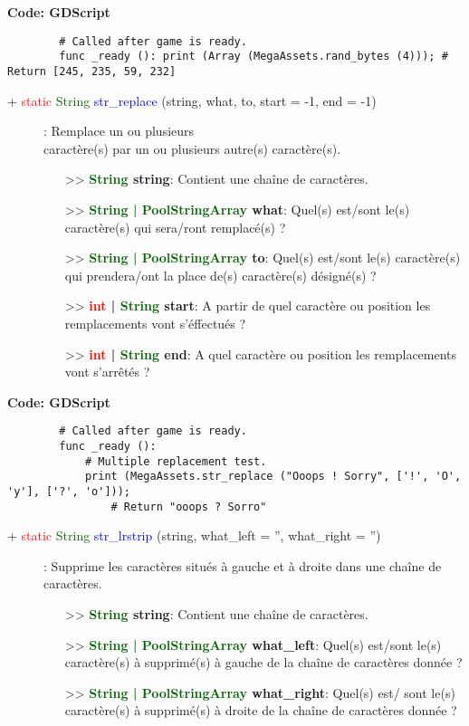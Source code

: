 \documentclass[a4paper, 11pt]{article}
\begin{document}
	\textbf{Code: GDScript}
	\begin{lstlisting}
		# Called after game is ready.
		func _ready (): print (Array (MegaAssets.rand_bytes (4))); # Return [245, 235, 59, 232]
	\end{lstlisting}
	\begin{description}
		\item [+ \textcolor{red}{static} \textcolor{darkgreen}{String} \textcolor{blue}{str\_replace} 
		(string, what, to, start = -1, end = -1)]: Remplace un ou plusieurs \\caractère(s) par un ou
		plusieurs autre(s) caractère(s).
		\begin{itemize}
			\item [>> \textbf{\textcolor{darkgreen}{String} string}:] Contient une chaîne de caractères.
			\item [>> \textbf{\textcolor{darkgreen}{String | PoolStringArray} what}:] Quel(s) est/sont le(s) 
			caractère(s) qui sera/ront remplacé(s) ?
			\item [>> \textbf{\textcolor{darkgreen}{String | PoolStringArray} to}:] Quel(s) est/sont le(s) 
			caractère(s) qui prendera/ont la place de(s) caractère(s) désigné(s) ?
			\item [>> \textbf{\textcolor{red}{int} | \textcolor{darkgreen}{String} start}:] A partir de quel
			caractère ou position les remplacements vont s'éffectués ?
			\item [>> \textbf{\textcolor{red}{int} | \textcolor{darkgreen}{String} end}:] A quel caractère 
			ou position les remplacements vont s'arrêtés ?\\
		\end{itemize}
	\end{description}
	\newpage \textbf{Code: GDScript}
	\begin{lstlisting}
		# Called after game is ready.
		func _ready ():
			# Multiple replacement test.
			print (MegaAssets.str_replace ("Ooops ! Sorry", ['!', 'O', 'y'], ['?', 'o']));
				# Return "ooops ? Sorro"
	\end{lstlisting}
	\begin{description}
		\item [+ \textcolor{red}{static} \textcolor{darkgreen}{String} \textcolor{blue}{str\_lrstrip} 
		(string, what\_left = '', what\_right = '')]: Supprime les caractères situés à gauche et à droite
		dans une chaîne de caractères.
		\begin{itemize}
			\item [>> \textbf{\textcolor{darkgreen}{String} string}:] Contient une chaîne de caractères.
			\item [>> \textbf{\textcolor{darkgreen}{String | PoolStringArray} what\_left}:] Quel(s) est/sont 
			le(s) caractère(s) à supprimé(s) à gauche de la chaîne de caractères donnée ?
			\item [>> \textbf{\textcolor{darkgreen}{String | PoolStringArray} what\_right}:] Quel(s) est/
			sont le(s) caractère(s) à supprimé(s) à droite de la chaîne de caractères donnée ?\\
		\end{itemize}
	\end{description}
\end{document}
